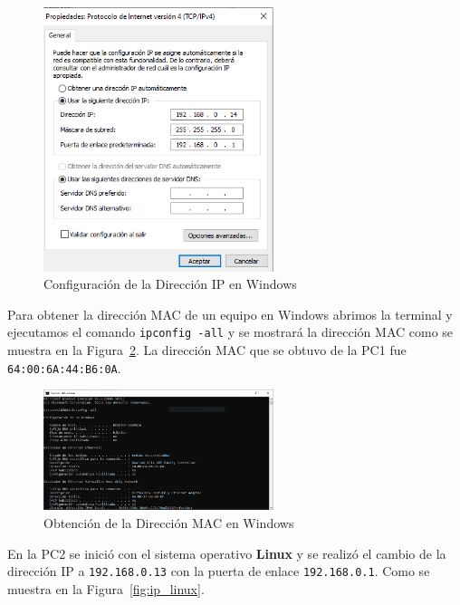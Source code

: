         \begin{figure}[H]
            \centering
            \includegraphics[width=0.6\textwidth]{img/cambiar_IP_Windows.png}
            \caption{Configuración de la Dirección IP en Windows}
            \label{fig:ip_windows}
        \end{figure}

        Para obtener la dirección MAC de un equipo en Windows abrimos la terminal y ejecutamos el comando \texttt{ipconfig -all} y se mostrará la dirección MAC como se muestra en la Figura~\ref{fig:mac_windows}. La dirección MAC que se obtuvo de la PC1 fue \texttt{64:00:6A:44:B6:0A}.

        \begin{figure}[H]
            \centering
            \includegraphics[width=0.6\textwidth]{img/direccion_MAC_windows.PNG}
            \caption{Obtención de la Dirección MAC en Windows}
            \label{fig:mac_windows}
        \end{figure}

        En la PC2 se inició con el sistema operativo \textbf{Linux} y se realizó el cambio de la dirección IP a \texttt{192.168.0.13} con la puerta de enlace \texttt{192.168.0.1}. Como se muestra en la Figura~\ref{fig:ip_linux}.

